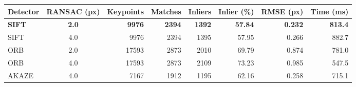 \begin{tabular}{lcrrrrrr}
\toprule
Detector & RANSAC (px) & Keypoints & Matches & Inliers & Inlier (\%) & RMSE (px) & Time (ms) \\
\midrule
\textbf{SIFT} & \textbf{2.0} & \textbf{9976} & \textbf{2394} & \textbf{1392} & \textbf{57.84} & \textbf{0.232} & \textbf{813.4} \\
SIFT & 4.0 & 9976 & 2394 & 1395 & 57.95 & 0.266 & 882.7 \\
ORB & 2.0 & 17593 & 2873 & 2010 & 69.79 & 0.874 & 781.0 \\
ORB & 4.0 & 17593 & 2873 & 2109 & 73.23 & 0.985 & 547.5 \\
AKAZE & 4.0 & 7167 & 1912 & 1195 & 62.16 & 0.258 & 715.1 \\
\bottomrule
\end{tabular}
